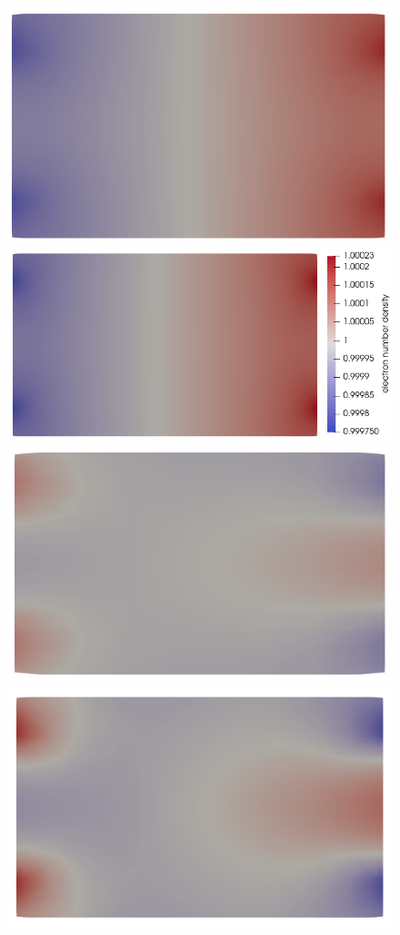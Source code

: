 \documentclass{report}
\begin{document}
\begin{figure}
    \includegraphics[scale=0.27]{clip_ne_T-1_lambda-1e-1_16-3-3.png}
    \includegraphics[scale=0.27]{clip_ne_T-1_lambda-1e-1_32-3-4.png}
    \includegraphics[scale=0.27]{clip_ni_T-1_lambda-1e-1_8-2-2.png}
    \includegraphics[scale=0.27]{clip_ni_T-1_lambda-1e-1_16-3-3.png}

\end{figure}
\end{document}
